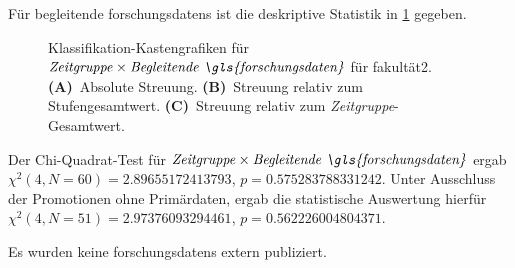 Für begleitende \glspl{forschungsdaten} ist die deskriptive Statistik in \cref{fig:faculty_h_sampled_evaluated_adjusted_factors-only_Zeitgruppe_x_Begleitende.FD_absolute_boxplot} gegeben.
\begin{figure}[!htbp]
    \centering%
    \resizebox{.33\textwidth}{!}{}%
    \resizebox{.33\textwidth}{!}{}%
    \resizebox{.33\textwidth}{!}{}%
    \caption{Klassifikation-Kastengrafiken für $\text{\textit{Zeitgruppe}}\times\text{\textit{Begleitende \gls{forschungsdaten}}}$ für \gls{fakultät2}. \textbf{(A)}~Absolute Streuung. \textbf{(B)}~Streuung relativ zum Stufengesamtwert. \textbf{(C)}~Streuung relativ zum \textit{Zeitgruppe}-Gesamtwert.}
    \label{fig:faculty_h_sampled_evaluated_adjusted_factors-only_Zeitgruppe_x_Begleitende.FD_absolute_boxplot}
\end{figure} 
Der Chi-Quadrat-Test für $\text{\textit{Zeitgruppe}}\times\text{\textit{Begleitende \gls{forschungsdaten}}}$ ergab $\chi^2 (\num{4}, N = \num{60}) = \num[round-mode=places,round-precision=3]{2.89655172413793}$, $p = \num[round-mode=places,round-precision=3]{0.575283788331242}$.
Unter Ausschluss der Promotionen ohne Primärdaten, ergab die statistische Auswertung hierfür $\chi^2 (\num{4}, N = \num{51}) = \num[round-mode=places,round-precision=3]{2.97376093294461}$, $p = \num[round-mode=places,round-precision=3]{0.562226004804371}$.

Es wurden keine \glspl{forschungsdaten} extern publiziert.

